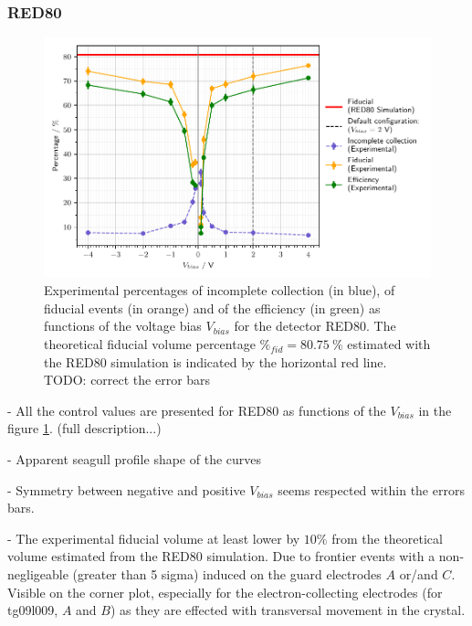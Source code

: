 \subsubsection{RED80}

\begin{figure}
\centering
\includegraphics[scale=1]{Figures/ElectrodesExperimental/red80_experimental_fiducial_volume.pdf}
\caption{Experimental percentages of incomplete collection (in blue), of fiducial events (in orange) and of the efficiency (in green) as functions of the voltage bias $V_{bias}$ for the detector RED80. The theoretical fiducial volume percentage $\%_{fid}=\SI{80.75}{\percent}$ estimated with the RED80 simulation is indicated by the horizontal red line. \\
{\color{red} TODO: correct the error bars}
}
\label{fig:red80-experimental-fiducial-volume}
\end{figure}

- All the control values are presented for RED80 as functions of the $V_{bias}$ in the figure \ref{fig:red80-experimental-fiducial-volume}. (full description...)

- Apparent seagull profile shape of the curves

- Symmetry between negative and positive $V_{bias}$ seems respected within the errors bars.

- The experimental fiducial volume at least lower by $10\%$ from the theoretical volume estimated from the RED80 simulation. Due to frontier events with a non-negligeable (greater than 5 sigma) induced on the guard electrodes $A$ or/and $C$. Visible on the corner plot, especially for the electron-collecting electrodes (for tg09l009, $A$ and $B$) as they are effected with transversal movement in the crystal.

